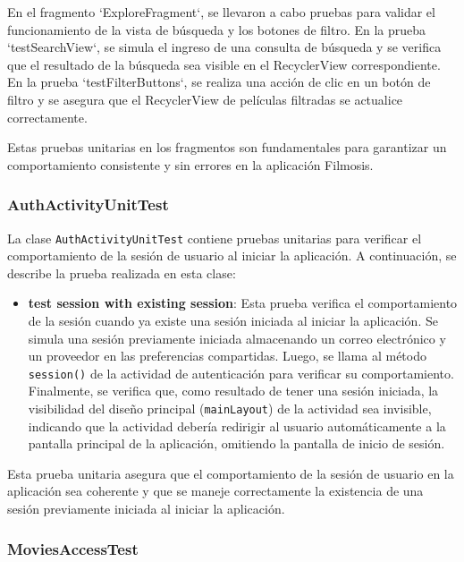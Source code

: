 \documentclass{article}
\begin{document}
En el fragmento `ExploreFragment`, se llevaron a cabo pruebas para validar el funcionamiento de la vista de búsqueda y los botones de filtro. En la prueba `testSearchView`, se simula el ingreso de una consulta de búsqueda y se verifica que el resultado de la búsqueda sea visible en el RecyclerView correspondiente. En la prueba `testFilterButtons`, se realiza una acción de clic en un botón de filtro y se asegura que el RecyclerView de películas filtradas se actualice correctamente.

Estas pruebas unitarias en los fragmentos son fundamentales para garantizar un comportamiento consistente y sin errores en la aplicación Filmosis.

\subsubsection{AuthActivityUnitTest}

La clase \texttt{AuthActivityUnitTest} contiene pruebas unitarias para verificar el comportamiento de la sesión de usuario al iniciar la aplicación. A continuación, se describe la prueba realizada en esta clase:

\begin{itemize}
    \item \textbf{test session with existing session}: Esta prueba verifica el comportamiento de la sesión cuando ya existe una sesión iniciada al iniciar la aplicación. Se simula una sesión previamente iniciada almacenando un correo electrónico y un proveedor en las preferencias compartidas. Luego, se llama al método \texttt{session()} de la actividad de autenticación para verificar su comportamiento. Finalmente, se verifica que, como resultado de tener una sesión iniciada, la visibilidad del diseño principal (\texttt{mainLayout}) de la actividad sea invisible, indicando que la actividad debería redirigir al usuario automáticamente a la pantalla principal de la aplicación, omitiendo la pantalla de inicio de sesión.
\end{itemize}

Esta prueba unitaria asegura que el comportamiento de la sesión de usuario en la aplicación sea coherente y que se maneje correctamente la existencia de una sesión previamente iniciada al iniciar la aplicación.


\subsubsection{MoviesAccessTest}
\end{document}
